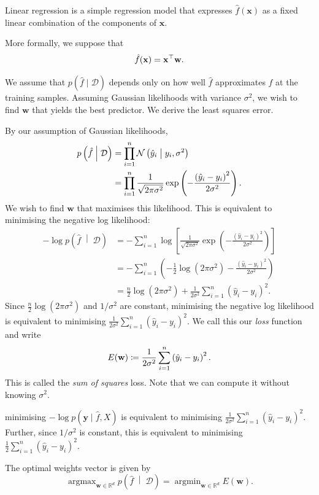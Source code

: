 \documentclass[11pt,twoside,openright]{report}
\newcommand\bbR{\mathbb{R}}
\newcommand\bw{\mathbf{w}}
\newcommand\bx{\mathbf{x}}
\newcommand\by{\mathbf{y}}
\newcommand\cD{\mathcal{D}}
\newcommand\cN{\mathcal{N}}
\DeclareMathOperator*{\argmax}{argmax}
\DeclareMathOperator*{\argmin}{argmin}
\begin{document}
Linear regression is a simple regression model that expresses $\hat f(\bx)$ as a fixed linear combination of the components of $\bx$.

More formally, we suppose that \[
  \hat f(\bx) = \bx^\top\bw \text.
\]

We assume that $p(\hat f \mid \cD)$ depends only on how well $\hat f$ approximates $f$ at the training samples. Assuming Gaussian likelihoods with variance $\sigma^2$, we wish to find $\bw$ that yields the best predictor. We derive the least squares error.

By our assumption of Gaussian likelihoods, \begin{align}
    p\left(\hat f \;\middle|\; \cD\right) &= \prod_{i = 1}^{n} \cN\left(\hat y_i \;\middle|\; y_i, \sigma^2\right) \label{eq:linearlikelihood} \\
    &= \prod_{i = 1}^{n} \frac{1}{\sqrt{2\pi\sigma^2}} \exp\left(-\frac{\left(\hat y_i - y_i\right)^2}{2\sigma^2}\right) \text. \nonumber
\end{align} We wish to find $\bw$ that maximises this likelihood. This is equivalent to minimising the negative log likelihood:\begin{align*}
    -\log p\left(\hat f \;\middle|\; \cD\right)
    &= - \sum_{i = 1}^{n} \log\left[\frac{1}{\sqrt{2\pi\sigma^2}} \exp\left(-\frac{\left(\hat y_i - y_i\right)^2}{2\sigma^2}\right)\right] \\
    &= - \sum_{i = 1}^{n} \left(-\frac{1}{2}\log\left(2\pi\sigma^2\right) -\frac{\left(\hat y_i - y_i\right)^2}{2\sigma^2}\right) \\
    &=  \frac{n}{2}\log\left(2\pi\sigma^2\right) + \frac{1}{2\sigma^2}\sum_{i = 1}^{n}\left(\hat y_i - y_i\right)^2 \text{.}
\end{align*} Since $\frac{n}{2}\log(2\pi\sigma^2)$ and $1/\sigma^2$ are constant, minimising the negative log likelihood is equivalent to minimising $\frac{1}{2\sigma^2}\sum_{i = 1}^{n}(\hat y_i - y_i)^2$. We call this our \emph{loss} function and write \[
  E(\bw) \coloneqq \frac{1}{2\sigma^2}\sum_{i = 1}^{n}\left(\hat y_i - y_i\right)^2 \text.
\] This is called the \emph{sum of squares} loss. Note that we can compute it without knowing $\sigma^2$.

 minimising $-\log p(\by \mid \hat f, X)$ is equivalent to minimising $\frac{1}{2\sigma^2}\sum_{i = 1}^{n}(\hat y_i - y_i)^2$. Further, since $1/\sigma^2$ is constant, this is equivalent to minimising $\frac12\sum_{i = 1}^{n}(\hat y_i - y_i)^2$.

The optimal weights vector is given by \[
    \argmax_{\bw \in \bbR^d} p\left(\hat f \;\middle|\; \cD\right) = \argmin_{\bw \in \bbR^d} E(\bw) \text{.}
\]
\end{document}
